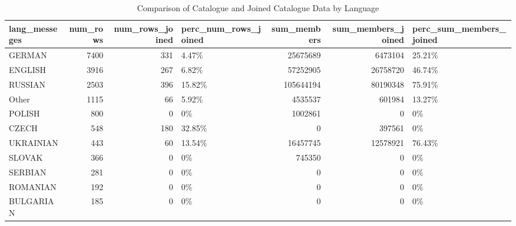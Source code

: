 \begin{table}[ht]
\centering
\begin{tabular}{lrrlrrl}
  \hline
lang\_messeges & num\_rows & num\_rows\_joined & perc\_num\_rows\_joined & sum\_members & sum\_members\_joined & perc\_sum\_members\_joined \\ 
  \hline
GERMAN & 7400 & 331 & 4.47\% & 25675689 & 6473104 & 25.21\% \\ 
  ENGLISH & 3916 & 267 & 6.82\% & 57252905 & 26758720 & 46.74\% \\ 
  RUSSIAN & 2503 & 396 & 15.82\% & 105644194 & 80190348 & 75.91\% \\ 
  Other & 1115 &  66 & 5.92\% & 4535537 & 601984 & 13.27\% \\ 
  POLISH & 800 &   0 & 0\% & 1002861 &   0 & 0\% \\ 
  CZECH & 548 & 180 & 32.85\% &   0 & 397561 & 0\% \\ 
  UKRAINIAN & 443 &  60 & 13.54\% & 16457745 & 12578921 & 76.43\% \\ 
  SLOVAK & 366 &   0 & 0\% & 745350 &   0 & 0\% \\ 
  SERBIAN & 281 &   0 & 0\% &   0 &   0 & 0\% \\ 
  ROMANIAN & 192 &   0 & 0\% &   0 &   0 & 0\% \\ 
  BULGARIAN & 185 &   0 & 0\% &   0 &   0 & 0\% \\ 
   \hline
\end{tabular}
\caption{Comparison of Catalogue and Joined Catalogue Data by Language} 
\label{tab:comparison}
\end{table}
